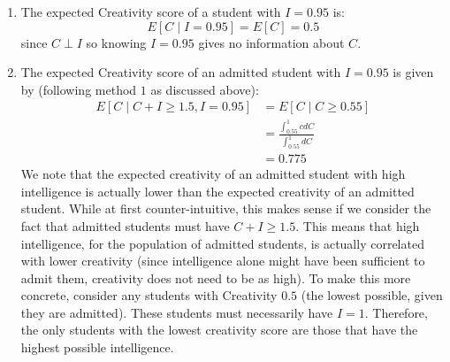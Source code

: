 \documentclass[12pt]{article}
\begin{document}
\begin{enumerate}
\item The expected Creativity score of a student with $I = 0.95$ is:
$$
E[C \mid I = 0.95] = E[C] = 0.5
$$
since $C \perp I$ so knowing $I = 0.95$ gives no information about $C$.
\item The expected Creativity score of an admitted student with $I = 0.95$ is given by (following method $1$ as discussed above):
\begin{align*}
E[C \mid C + I \geq 1.5, I = 0.95] &= E[C \mid C \geq 0.55] \\
&= \frac{\int_{0.55}^1 c dC}{\int_{0.55}^1 dC} \\
&= 0.775
\end{align*}
We note that the expected creativity of an admitted student with high intelligence is actually lower than the expected creativity of an admitted student. While at first counter-intuitive, this makes sense if we consider the fact that admitted students must have $C + I \geq 1.5$. This means that high intelligence, for the population of admitted students, is actually correlated with lower creativity (since intelligence alone might have been sufficient to admit them, creativity does not need to be as high). To make this more concrete, consider any students with Creativity $0.5$ (the lowest possible, given they are admitted). These students must necessarily have $I = 1$. Therefore, the only students with the lowest creativity score are those that have the highest possible intelligence.
\end{enumerate}

\pagebreak
\end{document}
